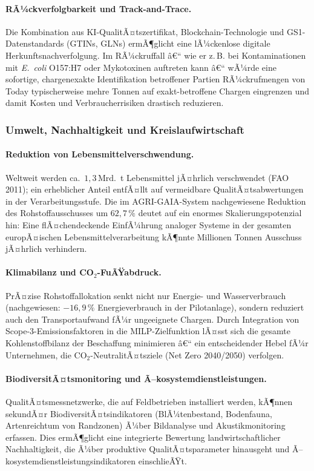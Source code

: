﻿\documentclass[12pt,a4paper]{article}
\theoremstyle{plain}
\theoremstyle{definition}
\begin{document}
	\paragraph{RÃ¼ckverfolgbarkeit und Track-and-Trace.}
	Die Kombination aus KI-QualitÃ¤tszertifi\-kat, Blockchain-Technologie
	und GS1-Datenstandards (GTINs, GLNs) ermÃ¶glicht eine lÃ¼ckenlose
	digitale Herkunftsnachverfolgung. Im RÃ¼ckruffall â€“ wie er z.\,B.
	bei Kontaminationen mit \textit{E.\ coli} O157:H7 oder Mykotoxinen
	auftreten kann â€“ wÃ¼rde eine sofortige, chargenexakte Identifikation
	betroffener Partien RÃ¼ckrufmengen von Today typischerweise mehre Tonnen
	auf exakt-betroffene Chargen eingrenzen und damit Kosten und
	Verbraucherrisiken drastisch reduzieren.

	\subsubsection{Umwelt, Nachhaltigkeit und Kreislaufwirtschaft}

	\paragraph{Reduktion von Lebensmittelverschwendung.}
	Weltweit werden ca.\ $1{,}3\,\text{Mrd.}$~t Lebensmittel jÃ¤hrlich
	verschwendet (FAO 2011); ein erheblicher Anteil entfÃ¤llt auf
	vermeidbare QualitÃ¤tsabwertungen in der Verarbeitungsstufe. Die im
	AGRI-GAIA-System nachgewiesene Reduktion des Rohstoffausschusses um
	$62{,}7\,\%$ deutet auf ein enormes Skalierungspotenzial hin: Eine
	flÃ¤chendeckende EinfÃ¼hrung analoger Systeme in der gesamten
	europÃ¤ischen Lebensmittelverarbeitung kÃ¶nnte Millionen Tonnen
	Ausschuss jÃ¤hrlich verhindern.

	\paragraph{Klimabilanz und CO$_2$-FuÃŸabdruck.}
	PrÃ¤zise Rohstoffallokation senkt nicht nur Energie- und
	Wasserverbrauch (nachgewiesen: $-16{,}9\,\%$ Energieverbrauch in der
	Pilotanlage), sondern reduziert auch den Transportaufwand fÃ¼r
	ungeeignete Chargen. Durch Integration von Scope-3-Emissionsfaktoren
	in die MILP-Zielfunktion lÃ¤sst sich die gesamte Kohlenstoffbilanz
	der Beschaffung minimieren â€“ ein entscheidender Hebel fÃ¼r
	Unternehmen, die CO$_2$-NeutralitÃ¤tsziele (Net Zero 2040/2050)
	verfolgen.

	\paragraph{BiodiversitÃ¤tsmonitoring und Ã–kosystemdienstleistungen.}
	QualitÃ¤ts\-messnetzwer\-ke, die auf Feldbetrieben installiert werden,
	kÃ¶nnen sekundÃ¤r BiodiversitÃ¤tsindikatoren (BlÃ¼tenbestand, Bodenfauna,
	Artenreichtum von Randzonen) Ã¼ber Bildanalyse und Akustikmonitoring
	erfassen. Dies ermÃ¶glicht eine integrierte Bewertung landwirtschaftlicher
	Nachhaltigkeit, die Ã¼ber produktive QualitÃ¤tsparameter hinausgeht
	und Ã–kosystemdienstleistungsindikatoren einschlieÃŸt.
\end{document}
